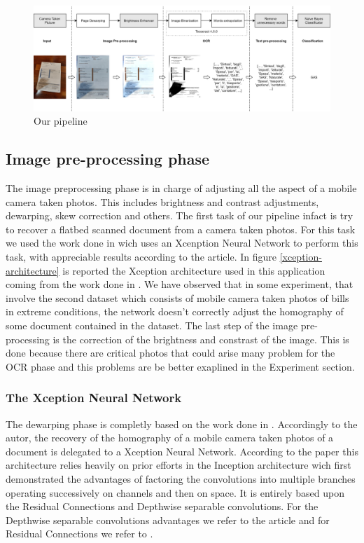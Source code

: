 \documentclass[10pt,twocolumn,letterpaper]{article}
\begin{document}
\begin{figure}[h]
  \centering
  \includegraphics[width=1.0\textwidth]{images/pipeline.png}
  \caption{Our pipeline}
  \label{fig:pipeline}
\end{figure}

\subsection{Image pre-processing phase}
The image preprocessing phase is in charge of adjusting all the aspect of a mobile camera taken photos. This includes brightness and contrast adjustments, dewarping, skew correction and others. The first task of our pipeline infact is try to recover a flatbed scanned document from a camera taken photos. For this task we used the work done in \cite{mobile-ocr} wich uses an Xcenption Neural Network \cite{xception_NN} to perform this task, with appreciable results according to the article. In figure \ref{xception-architecture} is reported the Xception architecture used in this application coming from the work done in \cite{Improvingcamera-based}. We have observed that in some experiment, that involve the second dataset which consists of mobile camera taken photos of bills in extreme conditions, the network doesn't correctly adjust the homography of some document contained in the dataset. The last step of the image pre-processing is the correction of the brightness and constrast of the image. This is done because there are critical photos that could arise many problem for the OCR phase and this problems are be better exaplined in the Experiment section.

\subsubsection{The Xception Neural Network}
The dewarping phase is completly based on the work done in \cite{mobile-ocr}. Accordingly to the autor, the recovery of the homography of a mobile camera taken photos of a document is delegated to a Xception Neural Network. According to the paper \cite{xception} this architecture relies heavily on prior efforts in the Inception architecture wich first demonstrated the advantages of factoring the convolutions into multiple branches operating successively on channels and then on space. It is entirely based upon the Residual Connections and Depthwise separable convolutions. For the Depthwise separable convolutions advantages we refer to the article \cite{https://towardsdatascience.com/a-basic-introduction-to-separable-convolutions-b99ec3102728} and for Residual Connections we refer to \cite{https://towardsdatascience.com/residual-blocks-building-blocks-of-resnet-fd90ca15d6ec}.
\end{document}
